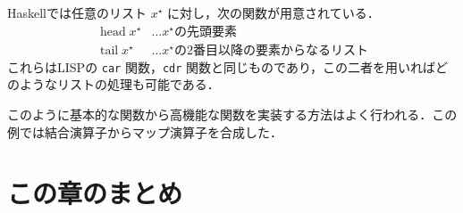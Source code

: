 \documentclass[a4paper,twocolumn]{jsbook}
\newcommand{\programminglanguage}[1]{\textsf{#1}}
\newcommand{\haskell}{\programminglanguage{Haskell}}
\newcommand{\lisp}{\programminglanguage{LISP}}
\newcommand{\code}[1]{\texttt{#1}}
\DeclareMathOperator{\mHead}{head}
\DeclareMathOperator{\mTail}{tail}
\newcommand{\mList}[1]{{#1}^\mathrm{\star}}
\begin{document}
\haskell では任意のリスト $\mList{x}$ に対し，次の関数が用意されている．
\begin{align*}
\mHead\mList{x}&\dots\text{$\mList{x}$の先頭要素}\\
\mTail\mList{x}&\dots\text{$\mList{x}$の2番目以降の要素からなるリスト}
\end{align*}
これらは\lisp  の \code{car} 関数，\code{cdr} 関数と同じものであり，この二者を用いればどのようなリストの処理も可能である．

このように基本的な関数から高機能な関数を実装する方法はよく行われる．この例では結合演算子からマップ演算子を合成した．

\section{この章のまとめ}
\end{document}
